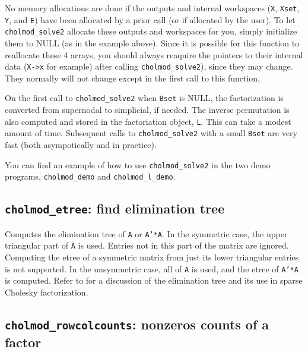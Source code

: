 \documentclass[11pt]{article}
\begin{document}
No memory allocations are done if the outputs and internal
workspaces ({\tt X}, {\tt Xset}, {\tt Y}, and {\tt E}) have been allocated
by a prior call (or if allocated by the user).  To let {\tt cholmod\_solve2}
allocate these outputs and workspaces for you, simply initialize them to
NULL (as in the example above).  Since it is possible for this function
to reallocate these 4 arrays, you should always reaquire the pointers to
their internal data ({\tt X->x} for example) after calling
{\tt cholmod\_solve2}), since they may change.  They normally will not
change except in the first call to this function.

On the first call to {\tt cholmod\_solve2} when {\tt Bset} is NULL,
the factorization is converted from supernodal to simplicial, if needed.
The inverse permutation is also computed and stored in the factoriation
object, {\tt L}.  This can take a modest amount of time.  Subsequent
calls to {\tt cholmod\_solve2} with a small {\tt Bset}
are very fast (both asympotically and in practice).

You can find an example of how to use {\tt cholmod\_solve2} in the
two demo programs, {\tt cholmod\_demo} and {\tt cholmod\_l\_demo}.

\subsection{{\tt cholmod\_etree}: find elimination tree}


Computes the elimination tree of {\tt A} or {\tt A'*A}.
In the symmetric case, the upper triangular part of {\tt A} is used.  Entries not
in this part of the matrix are ignored.  Computing the etree of a symmetric
matrix from just its lower triangular entries is not supported.
In the unsymmetric case, all of {\tt A} is used, and the etree of {\tt A'*A} is computed.
Refer to \cite{Liu90a} for a discussion of the elimination tree
and its use in sparse Cholesky factorization.

\subsection{{\tt cholmod\_rowcolcounts}: nonzeros counts of a factor}
\end{document}

